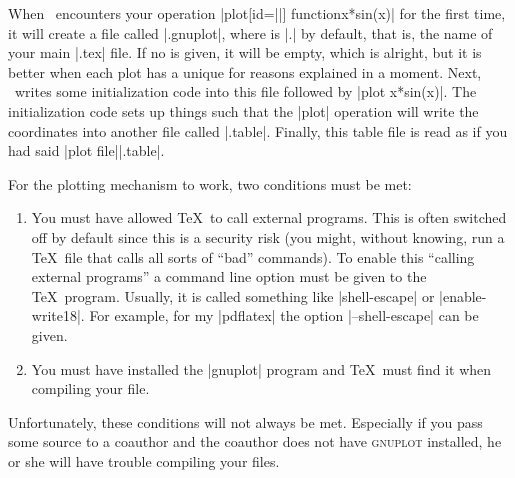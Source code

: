 When \tikzname\ encounters your operation
|plot[id=||] function{x*sin(x)}| for the first time, it will create a
file called |.gnuplot|, where  is
|\jobname.| by default, that is, the name of your main |.tex| file. If no
 is given, it will be empty, which is alright, but it is better when
each plot has a unique  for reasons explained in a moment. Next,
\tikzname\ writes some initialization code into this file followed by
|plot x*sin(x)|. The initialization code sets up things such that the |plot|
operation will write the coordinates into another file called
|.table|. Finally, this table file is read as if you had
said |plot file{||.table}|.

For the plotting mechanism to work, two conditions must be met:
%
\begin{enumerate}
    \item You must have allowed \TeX\ to call external programs. This is often
        switched off by default since this is a security risk (you might,
        without knowing, run a \TeX\ file that calls all sorts of ``bad''
        commands). To enable this ``calling external programs'' a command line
        option must be given to the \TeX\ program. Usually, it is called
        something like |shell-escape| or |enable-write18|. For example, for my
        |pdflatex| the option |--shell-escape| can be given.
    \item You must have installed the |gnuplot| program and \TeX\ must find it
        when compiling your file.
\end{enumerate}

Unfortunately, these conditions will not always be met. Especially if you pass
some source to a coauthor and the coauthor does not have \textsc{gnuplot}
installed, he or she will have trouble compiling your files.

